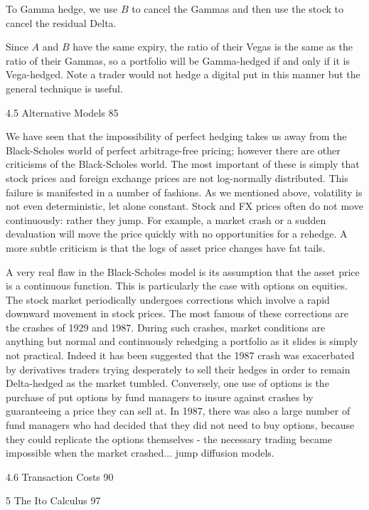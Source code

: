 To Gamma hedge, we use $B$ to cancel the Gammas and then use the stock to cancel the residual Delta.

Since $A$ and $B$ have the same expiry, the ratio of their Vegas is the same as the ratio of their Gammas, so a portfolio will be Gamma-hedged if and only if it is Vega-hedged. Note a trader would not hedge a digital put in this manner but the general technique is useful.

4.5 Alternative Models 85

We have seen that the impossibility of perfect hedging takes us away from the Black-Scholes world of perfect arbitrage-free pricing; however there are other criticisms of the Black-Scholes world. The most important of these is simply that stock prices and foreign exchange prices are not log-normally distributed. This failure is manifested in a number of fashions. As we mentioned above, volatility is not even deterministic, let alone constant. Stock and FX prices often do not move continuously: rather they jump. For example, a market crash or a sudden devaluation will move the price quickly with no opportunities for a rehedge. A more subtle criticism is that the logs of asset price changes have fat tails.

A very real flaw in the Black-Scholes model is its assumption that the asset price is a continuous function. This is particularly the case with options on equities. The stock market periodically undergoes corrections which involve a rapid downward movement in stock prices. The most famous of these corrections are the crashes of 1929 and 1987. During such crashes, market conditions are anything but normal and continuously rehedging a portfolio as it slides is simply not practical. Indeed it has been suggested that the 1987 crash was exacerbated by derivatives traders trying desperately to sell their hedges in order to remain Delta-hedged as the market tumbled. Conversely, one use of options is the purchase of put options by fund managers to insure against crashes by guaranteeing a price they can sell at. In 1987, there was also a large number of fund managers who had decided that they did not need to buy options, because they could replicate the options themselves - the necessary trading became impossible when the market crashed... jump diffusion models.

4.6 Transaction Costs 90



5 The Ito Calculus 97



